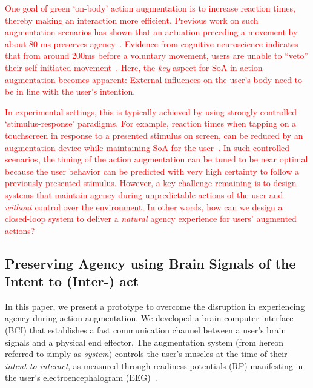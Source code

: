 \textcolor{red}{One goal of green `on-body' action augmentation is to increase reaction times, thereby making an interaction more efficient. Previous work on such augmentation scenarios has shown that an actuation preceding a movement by about 80 ms preserves agency~\cite{Kasahara2019-sk}. Evidence from cognitive neuroscience indicates that from around 200ms before a voluntary movement, users are unable to ``veto'' their self-initiated movement~\cite{Schultze-Kraft2016-bx}. Here, the \textit{key} aspect for SoA in action augmentation becomes apparent: External influences on the user's body need to be in line with the user's intention.}

\textcolor{red}{In experimental settings, this is typically achieved by using strongly controlled `stimulus-response' paradigms. For example, reaction times when tapping on a touchscreen in response to a presented stimulus on screen, can be reduced by an augmentation device while maintaining SoA for the user~\cite{Kasahara2019-sk, Kasahara2021-gy}. In such controlled scenarios, the timing of the action augmentation can be tuned to be near optimal because the user behavior can be predicted with very high certainty to follow a previously presented stimulus. However, a key challenge remaining is to design systems that maintain agency during unpredictable actions of the user and \textit{without} control over the environment. In other words, how can we design a closed-loop system to deliver a \textit{natural} agency experience for users' augmented actions?}


\subsection{Preserving Agency using Brain Signals of the Intent to (Inter-) act}
In this paper, we present a prototype to overcome the disruption in experiencing agency during action augmentation. We developed a brain-computer interface (BCI) that establishes a fast communication channel between a user's brain signals and a physical end effector. The augmentation system (from hereon referred to simply as \textit{system}) controls the user's muscles at the time of their \textit{intent to interact}, as measured through readiness potentials (RP) manifesting in the user's electroencephalogram (EEG)~\cite{Schurger2021-vp, Schultze-Kraft2016-bx, Schultze-Kraft2021-cu}. 

